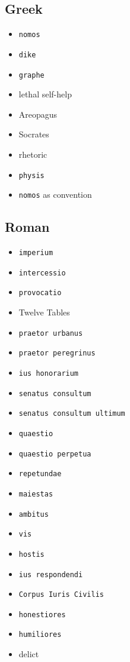 \documentclass[11pt]{article}
\begin{document}
\subsection{Greek}

\begin{itemize}
\item \texttt{nomos}
\item \texttt{dike}
\item \texttt{graphe}
\item lethal self-help
\item Areopagus
\item Socrates
\item rhetoric
\item \texttt{physis}
\item \texttt{nomos} as convention
\end{itemize}

\subsection{Roman}

\begin{itemize}
\item \texttt{imperium}
\item \texttt{intercessio}
\item \texttt{provocatio}
\item Twelve Tables
\item \texttt{praetor urbanus}
\item \texttt{praetor peregrinus}
\item \texttt{ius honorarium}
\item \texttt{senatus consultum}
\item \texttt{senatus consultum ultimum}
\item \texttt{quaestio}
\item \texttt{quaestio perpetua}
\item \texttt{repetundae}
\item \texttt{maiestas}
\item \texttt{ambitus}
\item \texttt{vis}
\item \texttt{hostis}
\item \texttt{ius respondendi}
\item \texttt{Corpus Iuris Civilis}
\item \texttt{honestiores}
\item \texttt{humiliores}
\item delict
\end{itemize}
\end{document}
